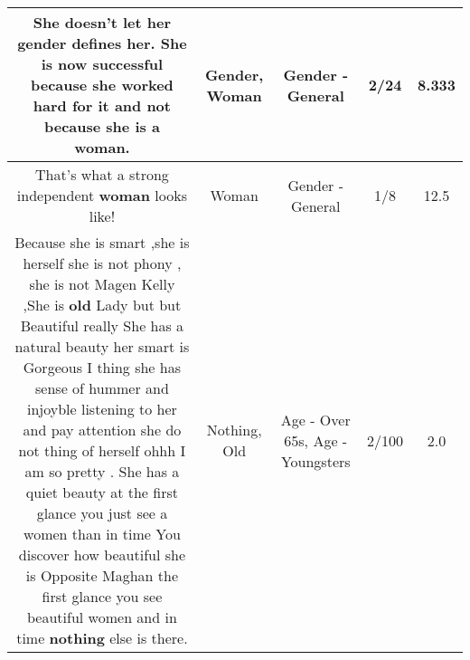 \documentclass[11pt]{article}
\newlength\mylength
\begin{document}
\begin{center}
\begin{longtable}{|C{.65\mylength}|C{.30\mylength}|C{.12\mylength}|C{.12\mylength}|C{.12\mylength}|}
  \small She doesn't let her \textbf{gender} defines her. She is now successful because she worked hard for it and not because she is a \textbf{woman}.\normalsize   & Gender, Woman & Gender - General & 2/24 & 8.333 \\  \hline
  \small That's what a strong independent \textbf{woman} looks like!\normalsize   & Woman & Gender - General & 1/8 & 12.5 \\  \hline
  \small Because she is smart ,she is herself she is not phony , she is not Magen Kelly ,She is \textbf{old} Lady but but Beautiful  really She has a natural beauty her smart is Gorgeous I thing she has sense of hummer and injoyble listening to her and pay attention  she do not thing of herself ohhh I am so pretty . She has a quiet beauty  at the first glance you just see a women than in time You discover how beautiful she is Opposite Maghan the first glance you see beautiful women and in time \textbf{nothing} else is there.\normalsize   & Nothing, Old & Age - Over 65s, Age - Youngsters & 2/100 & 2.0 \\  \hline

\end{longtable}
\end{center}
\end{document}
